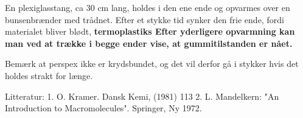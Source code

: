 



En plexiglasstang, ca 30 cm lang, holdes i den ene ende
og opvarmes over en bunsenbrænder med trådnet.
Efter et stykke tid synker den frie ende, fordi
materialet bliver blødt, \bf{termoplastiks}
Efter yderligere opvarmning kan man ved at trække i begge
ender vise, at \bf{gummitilstanden} er nået.

Bemærk at perspex ikke er krydsbundet, og det vil derfor
gå i stykker hvis det holdes strakt for længe.

Litteratur:
1. O. Kramer. Dansk Kemi, (1981) 113
2. L. Mandelkern: "An Introduction to Macromolecules".
Springer, Ny 1972.

